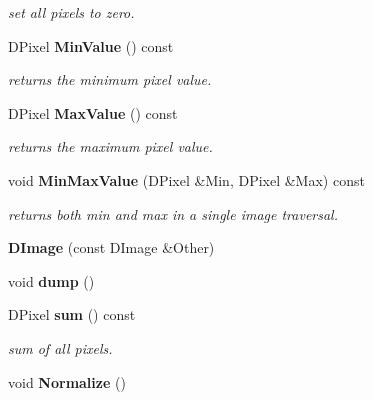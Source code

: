 \begin{CompactItemize}
\begin{CompactList}\small\item\em set all pixels to zero.\item\end{CompactList}\item 
{}
DPixel {\bf Min\-Value} () const\label{class_dimage_a9}

\begin{CompactList}\small\item\em returns the minimum pixel value.\item\end{CompactList}\item 
{}
DPixel {\bf Max\-Value} () const\label{class_dimage_a10}

\begin{CompactList}\small\item\em returns the maximum pixel value.\item\end{CompactList}\item 
{}
void {\bf Min\-Max\-Value} (DPixel \&Min, DPixel \&Max) const\label{class_dimage_a11}

\begin{CompactList}\small\item\em returns both min and max in a single image traversal.\item\end{CompactList}\item 
{}
{\bf DImage} (const DImage \&Other)\label{class_dimage_a12}

\item 
{}
void {\bf dump} ()\label{class_dimage_a13}

\item 
{}
DPixel {\bf sum} () const\label{class_dimage_a14}

\begin{CompactList}\small\item\em sum of all pixels.\item\end{CompactList}\item 
{}
void {\bf Normalize} ()\label{class_dimage_a15}


\end{CompactItemize}
